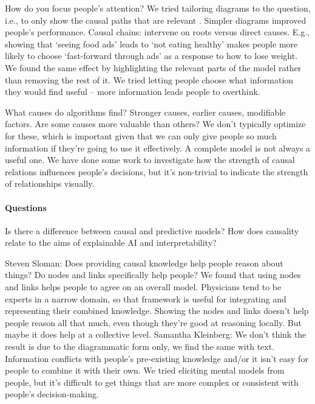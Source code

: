 How do you focus people's attention?
We tried tailoring diagrams to the question, i.e., to only show the causal paths that
are relevant \parencites{Kleinberg2021}.
Simpler diagrams improved people's performance.
Causal chains: intervene on roots versus direct causes.
E.g., showing that `seeing food ads' leads to `not eating healthy' makes people more
likely to choose `fast-forward through ads' as a response to how to lose weight.
We found the same effect by highlighting the relevant parts of the model rather than
removing the rest of it.
We tried letting people choose what information they would find useful -- more
information leads people to overthink.

What causes do algorithms find?
Stronger causes, earlier causes, modifiable factors.
Are some causes more valuable than others?
We don't typically optimize for these, which is important given that we can only give
people so much information if they're going to use it effectively.
A complete model is not always a useful one.
We have done some work to investigate how the strength of causal relations influences
people's decisions, but it's non-trivial to indicate the strength of relationships
visually.

\paragraph{Questions}
Is there a difference between causal and predictive models?
How does causality relate to the aims of explainable AI and interpretability?

Steven Sloman: Does providing causal knowledge help people reason about things?
Do nodes and links specifically help people?
We found that using nodes and links helps people to agree on an overall model.
Physicians tend to be experts in a narrow domain, so that framework is useful for
integrating and representing their combined knowledge.
Showing the nodes and links doesn't help people reason all that much, even though
they're good at reasoning locally.
But maybe it does help at a collective level.
Samantha Kleinberg: We don't think the result is due to the diagrammatic form only, we
find the same with text.
Information conflicts with people's pre-existing knowledge and/or it isn't easy for
people to combine it with their own.
We tried eliciting mental models from people, but it's difficult to get things that are
more complex or consistent with people's decision-making.
